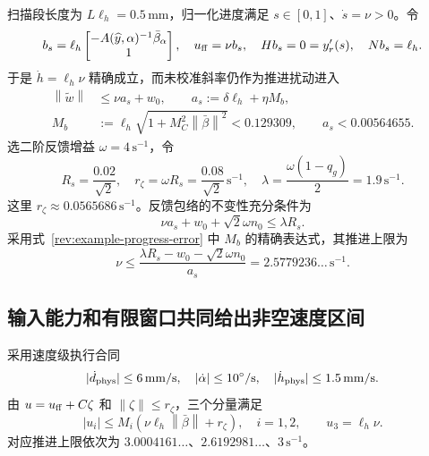 \documentclass[11pt,a4paper]{article}
\numberwithin{equation}{section}
\theoremstyle{definition}
\newcommand{\norm}[1]{\left\lVert#1\right\rVert}
\begin{document}
扫描段长度为 $L\ell_h=0.5\,\mathrm{mm}$，归一化进度满足
$s\in[0,1]$、$\dot s=\nu>0$。令
\begin{equation}
 b_s=\ell_h\begin{bmatrix}-A(\widehat y,\alpha)^{-1}\bar\beta_\alpha\\1\end{bmatrix},
 \quad u_{\rm ff}=\nu b_s,
 \quad Hb_s=0=y_r'(s),
 \quad Nb_s=\ell_h.
 \label{rev:example-feedforward}
\end{equation}
于是 $\dot h=\ell_h\nu$ 精确成立，而未校准斜率仍作为推进扰动进入
\begin{equation}
 \begin{aligned}
 \norm{\widetilde w}&\le\nu a_s+w_0,
 \qquad a_s:=\delta\ell_h+\eta M_b,\\
 M_b&:=\ell_h\sqrt{1+M_C^2\norm{\bar\beta}^2}
 <0.129309,\qquad a_s<0.00564655.
 \end{aligned}
 \label{rev:example-progress-error}
\end{equation}
选二阶反馈增益 $\omega=4\,\mathrm{s}^{-1}$，令
\begin{equation}
 R_s=\frac{0.02}{\sqrt2},
 \quad r_\zeta=\omega R_s=\frac{0.08}{\sqrt2}\,\mathrm{s}^{-1},
 \quad\lambda=\frac{\omega(1-q_g)}2=1.9\,\mathrm{s}^{-1}.
 \label{rev:example-feedback-constants}
\end{equation}
这里 $r_\zeta\approx0.0565686\,\mathrm{s}^{-1}$。反馈包络的不变性充分条件为
\begin{equation}
 \nu a_s+w_0+\sqrt2\omega n_0\le\lambda R_s.
 \label{rev:example-recovery-inequality}
\end{equation}
采用式~\eqref{rev:example-progress-error} 中 $M_b$ 的精确表达式，其推进上限为
\begin{equation}
 \nu\le
 \frac{\lambda R_s-w_0-\sqrt2\omega n_0}{a_s}
 =2.5779236\ldots\,\mathrm{s}^{-1}.
 \label{rev:example-recovery-speed}
\end{equation}

\subsection{输入能力和有限窗口共同给出非空速度区间}
采用速度级执行合同
\begin{equation}
 |\dot d_{\rm phys}|\le6\,\mathrm{mm/s},
 \quad|\dot\alpha|\le10^\circ/\mathrm{s},
 \quad|\dot h_{\rm phys}|\le1.5\,\mathrm{mm/s}.
 \label{rev:example-physical-input-set}
\end{equation}
由 $u=u_{\rm ff}+C\zeta$ 和 $\norm{\zeta}\le r_\zeta$，三个分量满足
\begin{equation}
 |u_i|\le M_i(\nu\ell_h\norm{\bar\beta}+r_\zeta),\quad i=1,2,
 \qquad u_3=\ell_h\nu.
 \label{rev:example-component-inputs}
\end{equation}
对应推进上限依次为
$3.0004161\ldots$、$2.6192981\ldots$、$3\,\mathrm{s}^{-1}$。
\end{document}
